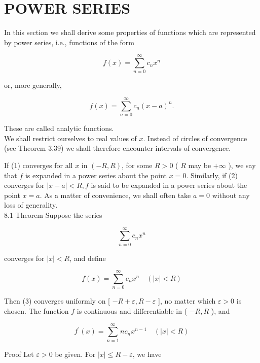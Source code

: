 \documentclass[10pt]{article}
\begin{document}
\section*{POWER SERIES}
In this section we shall derive some properties of functions which are represented by power series, i.e., functions of the form


\begin{equation*}
f(x)=\sum_{n=0}^{\infty} c_{n} x^{n} \tag{1}
\end{equation*}


or, more generally,


\begin{equation*}
f(x)=\sum_{n=0}^{\infty} c_{n}(x-a)^{n} . \tag{2}
\end{equation*}


These are called analytic functions.\\
We shall restrict ourselves to real values of $x$. Instead of circles of convergence (see Theorem 3.39) we shall therefore encounter intervals of convergence.

If (1) converges for all $x$ in $(-R, R)$, for some $R>0$ ( $R$ may be $+\infty$ ), we say that $f$ is expanded in a power series about the point $x=0$. Similarly, if (2) converges for $|x-a|<R, f$ is said to be expanded in a power series about the point $x=a$. As a matter of convenience, we shall often take $a=0$ without any loss of generality.\\
8.1 Theorem Suppose the series


\begin{equation*}
\sum_{n=0}^{\infty} c_{n} x^{n} \tag{3}
\end{equation*}


converges for $|x|<R$, and define


\begin{equation*}
f(x)=\sum_{n=0}^{\infty} c_{n} x^{n} \quad(|x|<R) \tag{4}
\end{equation*}


Then (3) converges uniformly on [ $-R+\varepsilon, R-\varepsilon$ ], no matter which $\varepsilon>0$ is chosen. The function $f$ is continuous and differentiable in ( $-R, R$ ), and


\begin{equation*}
f^{\prime}(x)=\sum_{n=1}^{\infty} n c_{n} x^{n-1} \quad(|x|<R) \tag{5}
\end{equation*}


Proof Let $\varepsilon>0$ be given. For $|x| \leq R-\varepsilon$, we have
\end{document}
